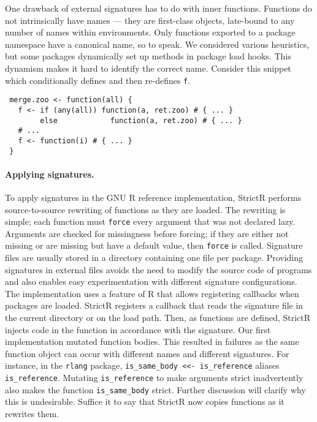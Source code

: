 \documentclass[review,creen,acmsmall]{acmart}
\newcommand{\code}[1]{\lstinline |#1|\xspace}
\renewcommand{\c}[1]{\lstinline |#1|\xspace}
\newcommand{\strictr}{{\sf StrictR}\xspace}
\begin{document}
One drawback of external signatures has to do with inner functions. Functions do
not intrinsically have names --- they are first-class objects, late-bound to any
number of names within environments. Only functions exported to a package
namespace have a canonical name, so to speak. We considered various heuristics,
but some packages dynamically set up methods in package load hooks. This dynamism
makes it hard to identify the correct name. Consider this snippet
which conditionally defines and then re-defines \c f.

\begin{lstlisting}
 merge.zoo <- function(all) {
   f <- if (any(all)) function(a, ret.zoo) # { ... }
        else            function(a, ret.zoo) # { ... }
   # ...
   f <- function(i) # { ... }
 }
\end{lstlisting}

\paragraph{Applying signatures.}
To apply signatures in the GNU R reference implementation, \strictr performs
source-to-source rewriting of functions as they are loaded. The rewriting is
simple; each function must \c{force} every argument that was not declared lazy.
Arguments are checked for missingness before forcing; if they are either not
missing or are missing but have a default value, then \c{force} is called.
Signature files are usually stored in a directory containing one file per
package. Providing signatures in external files avoids the need to modify the
source code of programs and also enables easy experimentation with different
signature configurations. The implementation uses a feature of R that allows
registering callbacks when packages are loaded. \strictr registers a callback
that reads the signature file in the current directory or on the load path.
Then, as functions are defined, \strictr injects code in the function in
accordance with the signature. Our first implementation mutated function bodies.
This resulted in failures as the same function object can occur with different
names and different signatures. For instance, in the \code{rlang} package,
\code{is_same_body <<- is_reference} aliases \code{is_reference}. Mutating
\code{is_reference} to make arguments strict inadvertently also makes the
function \code{is_same_body} strict. Further discussion will clarify why this is
undesirable. Suffice it to say that \strictr now copies functions as it rewrites
them.
\end{document}
